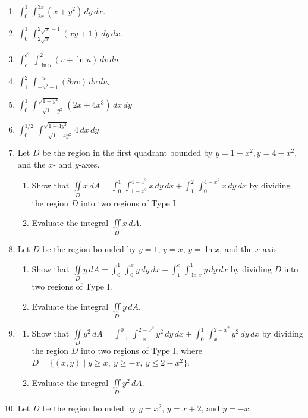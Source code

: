 \documentclass{exercises}
\begin{document}
\begin{enumerate}[resume]
\item $\int_{0}^{1}\,\int_{2x}^{3x}(x+y^{2})\,dy\,dx$.
\item $\int_{0}^{1}\,\int_{2\sqrt{x}}^{2\sqrt{x}+1}(xy+1)\,dy\,dx$.
\item $\int_{e}^{e^{2}}\,\int_{\ln u}^{2}(v+\ln u)\,dv\,du$.
\item $\int_{1}^{2}\,\int_{-u^{2}-1}^{-u}(8uv)\,dv\,du$.
\item $\int_{0}^{1}\,\int_{-\sqrt{1-y^{2}}}^{\sqrt{1-y^{2}}}(2x+4x^{3})\,dx\,dy$.
\item $\int_{0}^{1/2}\,\int_{-\sqrt{1-4y^{2}}}^{\sqrt{1-4y^{2}}}4\,dx\,dy$.
\item Let $D$ be the region in the first quadrant bounded by $y=1-x^{2},y=4-x^{2}$, and the $x$- and $y$-axes.
\begin{enumerate}[label=(\alph*)]
  \item Show that $\underset{D}{\iint}x\,dA=\int_{0}^{1}\,\int_{1-x^{2}}^{4-x^{2}}x\,dy\,dx+\int_{1}^{2}\,\int_{0}^{4-x^{2}}x\,dy\,dx$ by dividing the region $D$ into two regions of Type I.
  \item Evaluate the integral $\underset{D}{\iint}x\,dA$.
\end{enumerate}
\item Let $D$ be the region bounded by $y=1$, $y=x$, $y=\ln x$, and the $x$-axis.
\begin{enumerate}[label=(\alph*)]
  \item Show that $\underset{D}{\iint}y\,dA=\int_{0}^{1}\,\int_{0}^{x}y\,dy\,dx+\int_{1}^{e}\,\int_{\ln x}^{1}y\,dy\,dx$ by dividing $D$ into two regions of Type I.
  \item Evaluate the integral $\underset{D}{\iint}y\,dA$.
\end{enumerate}
\item
\begin{enumerate}[label=(\alph*)]
  \item Show that $\underset{D}{\iint}y^{2}\,dA=\int_{-1}^{0}\,\int_{-x}^{2-x^{2}}y^{2}\,dy\,dx+\int_{0}^{1}\,\int_{x}^{2-x^{2}}y^{2}\,dy\,dx$ by dividing the region $D$ into two regions of Type I, where $D=\{(x,y)\mid y\ge x,\ y\ge -x,\ y\le 2-x^{2}\}$.
  \item Evaluate the integral $\underset{D}{\iint}y^{2}\,dA$.
\end{enumerate}
\item Let $D$ be the region bounded by $y=x^{2}$, $y=x+2$, and $y=-x$.
\begin{enumerate}[label=(\alph*)]

\end{enumerate}
\end{enumerate}
\end{document}
